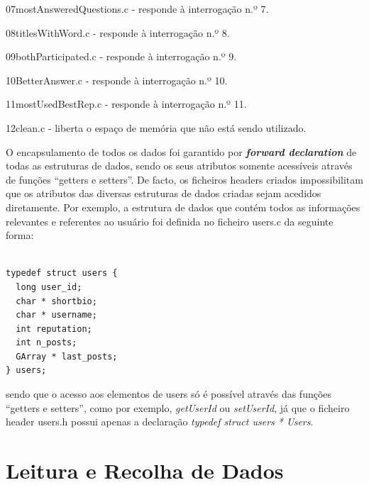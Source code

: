 \documentclass[a4paper]{report}
\begin{document}
\begin{itemize}
\begin{item} 07mostAnsweredQuestions.c - responde à interrogação n.º 7.\end{item}
\begin{item} 08titlesWithWord.c - responde à interrogação n.º 8.\end{item}
\begin{item} 09bothParticipated.c - responde à interrogação n.º 9.\end{item}
\begin{item} 10BetterAnswer.c - responde à interrogação n.º 10.\end{item}
\begin{item} 11mostUsedBestRep.c - responde à interrogação n.º 11.\end{item}
\begin{item} 12clean.c - liberta o espaço de memória que não está sendo utilizado.\end{item}
\end{itemize}


O encapsulamento de todos os dados foi garantido por \textbf{\textit{forward declaration}}
de todas as estruturas de dados, sendo os seus atributos somente acessíveis através
de funções ``getters e setters''. De facto, os ficheiros headers criados impossibilitam
que os atributos das diversas estruturas de dados criadas sejam acedidos diretamente.
Por exemplo, a estrutura de dados que contém todos as informações relevantes e
referentes ao usuário foi definida no ficheiro users.c da seguinte forma:

\begin{verbatim}

typedef struct users {
  long user_id;
  char * shortbio;
  char * username;
  int reputation;
  int n_posts;
  GArray * last_posts;
} users;

\end{verbatim}

sendo que o acesso aos elementos de users só é possível através das funções
``getters e setters'', como por exemplo, \textit{getUserId} ou
\textit{setUserId}, já que o ficheiro header users.h possui apenas a declaração
\textit{typedef struct users * Users}.

\section{Leitura e Recolha de Dados}
\end{document}

